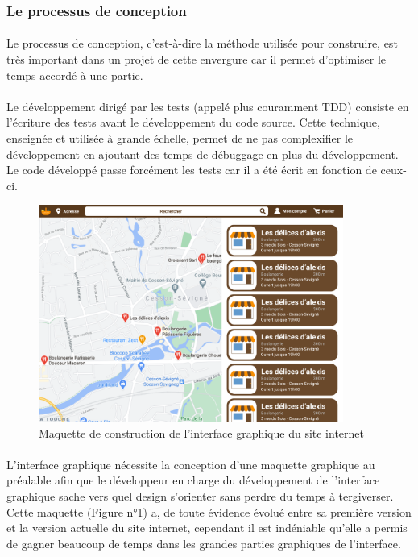 \documentclass[a4paper, 12pt]{article}
\begin{document}
\subsubsection{Le processus de conception}
\paragraph{}Le processus de conception, c’est-à-dire la méthode utilisée pour construire, est très important dans un projet de cette envergure car il permet d’optimiser le temps accordé à une partie.
\paragraph{}Le développement dirigé par les tests (appelé plus couramment TDD) consiste en l’écriture des tests avant le développement du code source. Cette technique, enseignée et utilisée à grande échelle, permet de ne pas complexifier le développement en ajoutant des temps de débuggage en plus du développement. Le code développé passe forcément les tests car il a été écrit en fonction de ceux-ci.

\begin{figure}[H]
	\begin{center}
		\includegraphics[width=10cm]{fig/maquette.png}
		\caption{Maquette de construction de l'interface graphique du site internet}
		\label{fig:maquette}
	\end{center}
\end{figure}

\paragraph{}L’interface graphique nécessite la conception d’une maquette graphique au préalable afin que le développeur en charge du développement de l’interface graphique sache vers quel design s’orienter sans perdre du temps à tergiverser. Cette maquette (Figure n°\ref{fig:maquette}) a, de toute évidence évolué entre sa première version et la version actuelle du site internet, cependant il est indéniable qu’elle a permis de gagner beaucoup de temps dans les grandes parties graphiques de l’interface.
\end{document}

